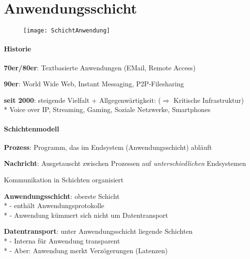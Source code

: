 \section{Anwendungsschicht}
\begin{figure}[H]\centering\texttt{[image: SchichtAnwendung]}\end{figure}

\paragraph{Historie}
\begin{items}
  \item \textbf{70er/80er}: Textbasierte Anwendungen (EMail, Remote Access)
  \item \textbf{90er}: World Wide Web, Instant Messaging, P2P-Filesharing
  \item \textbf{seit 2000}: steigende Vielfalt + Allgegenwärtigkeit: ($\Rightarrow$ Kritische Infrastruktur) \\* Voice over IP, Streaming, Gaming, Soziale Netzwerke, Smartphones
\end{items}

\paragraph{Schichtenmodell}
\begin{items}
  \item \textbf{Prozess}: Programm, das im Endsystem (Anwendungsschicht) abläuft
  \item \textbf{Nachricht}: Ausgetauscht zwischen Prozessen auf \emph{unterschiedlichen} Endsystemen
  \item Kommunikation in Schichten organisiert
  \item \textbf{Anwendungsschicht}: oberste Schicht \\*
    - enthält Anwendungsprotokolle \\*
    - Anwendung kümmert sich nicht um Datentransport
  \item \textbf{Datentransport}: unter Anwendungsschicht liegende Schichten \\*
    - Interna für Anwendung transparent \\*
    - Aber: Anwendung merkt Verzögerungen (Latenzen)
\end{items}

